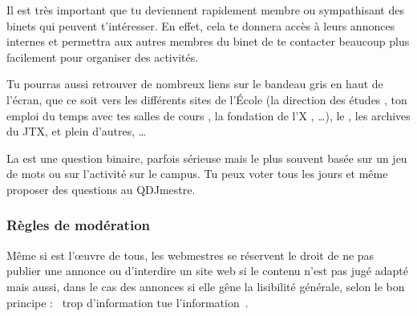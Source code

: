 Il est tr\`es important que tu deviennent rapidement membre ou sympathisant des binets qui peuvent t'int\'eresser.
En effet, cela te donnera acc\`es \`a leurs annonces internes et permettra aux autres membres du binet de te 
contacter beaucoup plus facilement pour organiser des activit\'es.


Tu pourras aussi retrouver de nombreux liens sur le bandeau gris en haut de l'écran, que ce soit vers les différents sites de l'\'Ecole (la direction des études , ton emploi du temps avec tes salles de cours , la fondation de l'X , \dots), le , les archives du JTX, et plein d'autres, \dots


La  est une question binaire, parfois s\'erieuse mais le
plus souvent bas\'ee sur un jeu de mots ou sur l'activit\'e sur le
campus. Tu peux voter tous les jours et m\^eme proposer des questions
au QDJmestre.

\subsubsection{R\`egles de mod\'eration}

M\^eme si \fkz est l'\oe uvre de tous, les webmestres se r\'eservent le droit de ne pas publier une annonce ou d'interdire un site web si le contenu
n'est pas jug\'e adapt\'e mais aussi, dans le cas des annonces si elle g\^ene la lisibilit\'e g\'en\'erale, selon le bon principe : \guillemotleft~trop
d'information tue l'information~\guillemotright .

